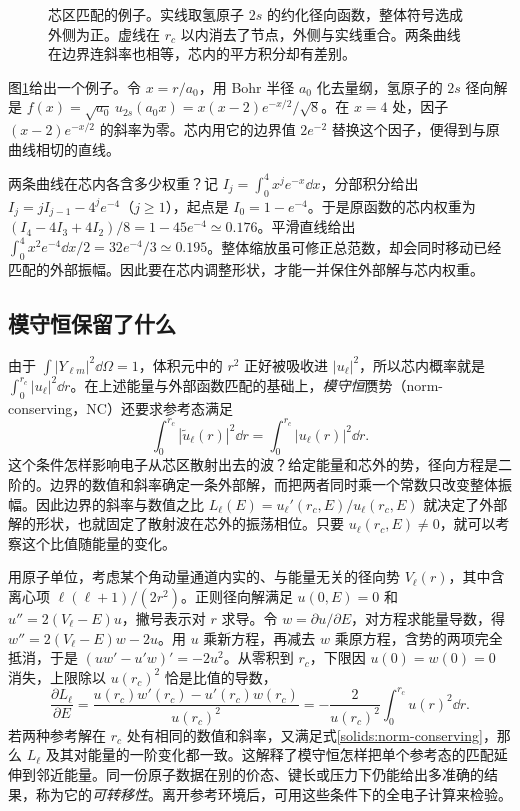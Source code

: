 \begin{figure}[htbp]
\centering

\caption{芯区匹配的例子。实线取氢原子 $2s$ 的约化径向函数，整体符号选成外侧为正。虚线在 $r_c$ 以内消去了节点，外侧与实线重合。两条曲线在边界连斜率也相等，芯内的平方积分却有差别。}
\label{solids:radial-example}
\end{figure}

图\ref{solids:radial-example}给出一个例子。令 $x=r/a_0$，用 Bohr 半径 $a_0$ 化去量纲，氢原子的 $2s$ 径向解是 $f(x)=\sqrt{a_0}\,u_{2s}(a_0x)=x(x-2)e^{-x/2}/\sqrt8$。在 $x=4$ 处，因子 $(x-2)e^{-x/2}$ 的斜率为零。芯内用它的边界值 $2e^{-2}$ 替换这个因子，便得到与原曲线相切的直线。

两条曲线在芯内各含多少权重？记 $I_j=\int_0^4 x^je^{-x}\dd x$，分部积分给出 $I_j=jI_{j-1}-4^je^{-4}$（$j\ge1$），起点是 $I_0=1-e^{-4}$。于是原函数的芯内权重为 $(I_4-4I_3+4I_2)/8=1-45e^{-4}\simeq0.176$。平滑直线给出 $\int_0^4 x^2 e^{-4}\dd x/2=32e^{-4}/3\simeq0.195$。整体缩放虽可修正总范数，却会同时移动已经匹配的外部振幅。因此要在芯内调整形状，才能一并保住外部解与芯内权重。

\subsection{模守恒保留了什么}
由于 $\int |Y_{\ell m}|^2\dd\Omega=1$，体积元中的 $r^2$ 正好被吸收进 $|u_\ell|^2$，所以芯内概率就是 $\int_0^{r_c}|u_\ell|^2\dd r$。在上述能量与外部函数匹配的基础上，\emph{模守恒}赝势（norm-conserving，NC）还要求参考态满足
\begin{equation}\label{solids:norm-conserving}
\int_0^{r_c}|\widetilde u_\ell(r)|^2\dd r=\int_0^{r_c}|u_\ell(r)|^2\dd r .
\end{equation}
这个条件怎样影响电子从芯区散射出去的波？给定能量和芯外的势，径向方程是二阶的。边界的数值和斜率确定一条外部解，而把两者同时乘一个常数只改变整体振幅。因此边界的斜率与数值之比 $L_\ell(E)=u_\ell'(r_c,E)/u_\ell(r_c,E)$ 就决定了外部解的形状，也就固定了散射波在芯外的振荡相位。只要 $u_\ell(r_c,E)\ne0$，就可以考察这个比值随能量的变化。

用原子单位，考虑某个角动量通道内实的、与能量无关的径向势 $V_\ell(r)$，其中含离心项 $\ell(\ell+1)/(2r^2)$。正则径向解满足 $u(0,E)=0$ 和 $u''=2(V_\ell-E)u$，撇号表示对 $r$ 求导。令 $w=\partial u/\partial E$，对方程求能量导数，得 $w''=2(V_\ell-E)w-2u$。用 $u$ 乘新方程，再减去 $w$ 乘原方程，含势的两项完全抵消，于是 $(uw'-u'w)'=-2u^2$。从零积到 $r_c$，下限因 $u(0)=w(0)=0$ 消失，上限除以 $u(r_c)^2$ 恰是比值的导数，
\begin{equation}\label{solids:log-slope}
 \frac{\partial L_\ell}{\partial E}
 =\frac{u(r_c)w'(r_c)-u'(r_c)w(r_c)}{u(r_c)^2}
 =-\frac{2}{u(r_c)^2}\int_0^{r_c}u(r)^2\dd r .
\end{equation}
若两种参考解在 $r_c$ 处有相同的数值和斜率，又满足式\eqref{solids:norm-conserving}，那么 $L_\ell$ 及其对能量的一阶变化都一致。这解释了模守恒怎样把单个参考态的匹配延伸到邻近能量。同一份原子数据在别的价态、键长或压力下仍能给出多准确的结果，称为它的\emph{可转移性}。离开参考环境后，可用这些条件下的全电子计算来检验。

